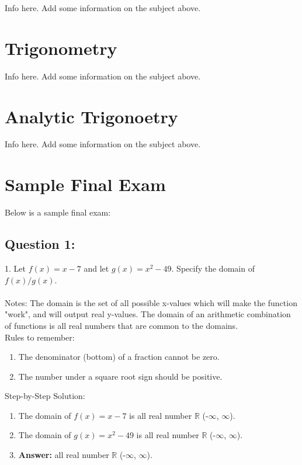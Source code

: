 \documentclass[12pt, letterpaper]{article}
\begin{document}
Info here. Add some information on the subject above. 

\section{Trigonometry}

Info here. Add some information on the subject above. 

\section{Analytic Trigonoetry}

Info here. Add some information on the subject above. 


\section{Sample Final Exam}
Below is a sample final exam:

\subsection{Question 1:}
1. Let $f(x)=x-7$ and let $g(x)=x^2-49$. Specify the domain of $f(x)/g(x)$.\\\\
Notes: The domain is the set of all possible x-values which will make the 
function "work", and will output real y-values. The domain of an arithmetic 
combination of functions is all real numbers that are common to the 
domains. \\

Rules to remember:
\begin{enumerate}
  \item The denominator (bottom) of a fraction cannot be zero.
  \item The number under a square root sign should be positive.
\end{enumerate}

Step-by-Step Solution:
\begin{enumerate}
  \item The domain of $f(x)=x-7$ is all real number 
  $\mathbb{R}$ (-$\infty$, $\infty$). 
  \item The domain of $g(x)=x^2-49$ is all real number 
  $\mathbb{R}$ (-$\infty$, $\infty$).
  \item \textbf{Answer:} all real number $\mathbb{R}$ (-$\infty$, $\infty$).
\end{enumerate}
\end{document}
